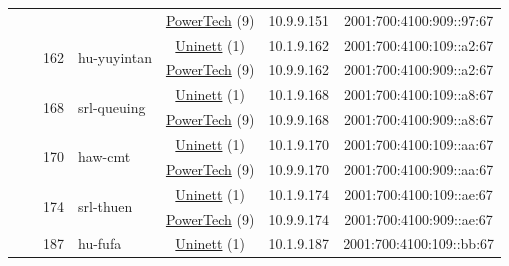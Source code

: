 \begin{small}
\begin{center}
\begin{longtable}{|c|c|c|c|c|c|c|c|}
  &  &  &  & \multicolumn{2}{|c|}{\tiny{\href{http://www.powertech.no}{PowerTech} (9)}} & \tiny{10.9.9.151} & \tiny{2001:700:4100:909::97:67} \\* \cline{3-3}\cline{4-4}\cline{5-5}\cline{6-6}\cline{7-7}\cline{8-8}
  &  & \multirow{2}{*}{\tiny{162}} & \multicolumn{1}{|l|}{\multirow{2}{*}{\tiny{hu-yuyintan}}} & \multicolumn{2}{|c|}{\tiny{\href{https://www.uninett.no}{Uninett} (1)}} & \tiny{10.1.9.162} & \tiny{2001:700:4100:109::a2:67} \\* \cline{5-5}\cline{6-6}\cline{7-7}\cline{8-8}
  &  &  &  & \multicolumn{2}{|c|}{\tiny{\href{http://www.powertech.no}{PowerTech} (9)}} & \tiny{10.9.9.162} & \tiny{2001:700:4100:909::a2:67} \\* \cline{3-3}\cline{4-4}\cline{5-5}\cline{6-6}\cline{7-7}\cline{8-8}
  &  & \multirow{2}{*}{\tiny{168}} & \multicolumn{1}{|l|}{\multirow{2}{*}{\tiny{srl-queuing}}} & \multicolumn{2}{|c|}{\tiny{\href{https://www.uninett.no}{Uninett} (1)}} & \tiny{10.1.9.168} & \tiny{2001:700:4100:109::a8:67} \\* \cline{5-5}\cline{6-6}\cline{7-7}\cline{8-8}
  &  &  &  & \multicolumn{2}{|c|}{\tiny{\href{http://www.powertech.no}{PowerTech} (9)}} & \tiny{10.9.9.168} & \tiny{2001:700:4100:909::a8:67} \\* \cline{3-3}\cline{4-4}\cline{5-5}\cline{6-6}\cline{7-7}\cline{8-8}
  &  & \multirow{2}{*}{\tiny{170}} & \multicolumn{1}{|l|}{\multirow{2}{*}{\tiny{haw-cmt}}} & \multicolumn{2}{|c|}{\tiny{\href{https://www.uninett.no}{Uninett} (1)}} & \tiny{10.1.9.170} & \tiny{2001:700:4100:109::aa:67} \\* \cline{5-5}\cline{6-6}\cline{7-7}\cline{8-8}
  &  &  &  & \multicolumn{2}{|c|}{\tiny{\href{http://www.powertech.no}{PowerTech} (9)}} & \tiny{10.9.9.170} & \tiny{2001:700:4100:909::aa:67} \\* \cline{3-3}\cline{4-4}\cline{5-5}\cline{6-6}\cline{7-7}\cline{8-8}
  &  & \multirow{2}{*}{\tiny{174}} & \multicolumn{1}{|l|}{\multirow{2}{*}{\tiny{srl-thuen}}} & \multicolumn{2}{|c|}{\tiny{\href{https://www.uninett.no}{Uninett} (1)}} & \tiny{10.1.9.174} & \tiny{2001:700:4100:109::ae:67} \\* \cline{5-5}\cline{6-6}\cline{7-7}\cline{8-8}
  &  &  &  & \multicolumn{2}{|c|}{\tiny{\href{http://www.powertech.no}{PowerTech} (9)}} & \tiny{10.9.9.174} & \tiny{2001:700:4100:909::ae:67} \\* \cline{3-3}\cline{4-4}\cline{5-5}\cline{6-6}\cline{7-7}\cline{8-8}
  &  & \multirow{2}{*}{\tiny{187}} & \multicolumn{1}{|l|}{\multirow{2}{*}{\tiny{hu-fufa}}} & \multicolumn{2}{|c|}{\tiny{\href{https://www.uninett.no}{Uninett} (1)}} & \tiny{10.1.9.187} & \tiny{2001:700:4100:109::bb:67} \\* \cline{5-5}\cline{6-6}\cline{7-7}\cline{8-8}

\end{longtable}
\end{center}
\end{small}

